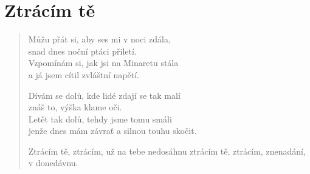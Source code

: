 \section*{Ztrácím tě}

\begin{verse}
Můžu přát si, aby ses mi v noci zdála,\\
snad dnes noční ptáci přiletí. \\
Vzpomínám si, jak jsi na Minaretu stála \\
a já jsem cítil zvláštní napětí.

Dívám se dolů, kde lidé zdají se tak malí\\
znáš to, výška klame oči.\\
Letět tak dolů, tehdy jsme tomu smáli\\
jenže dnes mám závrať a silnou touhu skočit.

Ztrácím tě, ztrácím, už na tebe nedosáhnu
ztrácím tě, ztrácím, znenadání,
v donedávnu.



\end{verse}
